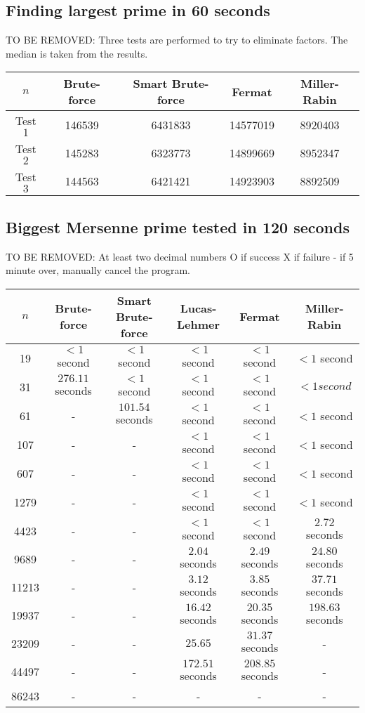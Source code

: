 \documentclass[main.tex]{subfiles}
\begin{document}
\subsection{Finding largest prime in 60 seconds}

TO BE REMOVED:
Three tests are performed to try to eliminate factors. The median is taken from
the results.

\begin{table}[ht!]
  \centering
  \begin{tabular}{||c | c c c c||}
    \hline
    $n$ & Brute-force & Smart Brute-force & Fermat & Miller-Rabin \\ [0.5ex] 
    \hline\hline
    Test $1$ & 146539 & 6431833 & 14577019 & 8920403\\ 
    Test $2$ & 145283 & 6323773 & 14899669 & 8952347\\ 
    Test $3$ & 144563 & 6421421 & 14923903 & 8892509\\   [1ex] 
    \hline
  \end{tabular}
\end{table}

\subsection{Biggest Mersenne prime tested in 120 seconds}

TO BE REMOVED:
At least two decimal numbers O if success X if failure - if 5 minute over,
manually cancel the program.

\begin{table}[ht!]
  \centering
  \begin{tabular}{||c | c c c c c||}
    \hline
    $n$ & Brute-force & Smart Brute-force & Lucas-Lehmer & Fermat & Miller-Rabin  \\ [0.5ex] 
    \hline\hline
    19 & $<1$ second & $<1$ second & $<1$ second & $<1$ second & $<1$ second\\
    31 & $276.11$ seconds & $<1$ second & $<1$ second & $<1$ second & $<1 second$\\
    61 & - & $101.54$ seconds & $<1$ second & $<1$ second & $<1$ second\\
    107 & - & - & $<1$ second & $<1$ second & $<1$ second\\
    607 & - & - & $<1$ second & $<1$ second & $<1$ second\\
    1279 & - & - & $<1$ second & $<1$ second & $<1$ second\\
    4423 & - & - & $<1$ second & $<1$ second & $2.72$ seconds\\
    9689 & - & - & $2.04$ seconds & $2.49$ seconds & $24.80$ seconds\\
    11213 & - & - & $3.12$ seconds & $3.85$ seconds & $37.71$ seconds\\
    19937 & - & - & $16.42$ seconds & $20.35$ seconds &  $198.63$ seconds\\
    23209 & - & - & $25.65$ & $31.37$ seconds & -\\ 
    44497 & - & - &  $172.51$ seconds &  $208.85$ seconds & -\\ 
    86243 & - & - & - & - & -\\  [1ex] 
    \hline
  \end{tabular}
\end{table}
\end{document}
